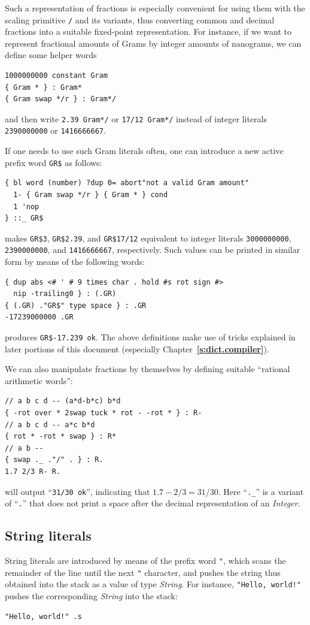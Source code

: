 \documentclass[12pt,oneside]{article}
\def\refpoint#1{{\rm\textbf{\ref{#1}}}}
\let\ptref=\refpoint
\def\mysubsection#1{\subsection{#1}\fancyhead[C]{\small{\textsc{\textrm{\thesubsection.} #1}}}}
\begin{document}
Such a representation of fractions is especially convenient for using them with the scaling primitive {\tt */} and its variants, thus converting common and decimal fractions into a suitable fixed-point representation. For instance, if we want to represent fractional amounts of Grams by integer amounts of nanograms, we can define some helper words
\begin{verbatim}
1000000000 constant Gram
{ Gram * } : Gram*
{ Gram swap */r } : Gram*/
\end{verbatim}
and then write {\tt 2.39 Gram*/} or {\tt 17/12 Gram*/} instead of integer literals {\tt 2390000000} or {\tt 1416666667}.

If one needs to use such Gram literals often, one can introduce a new active prefix word {\tt GR\$} as follows:
\begin{verbatim}
{ bl word (number) ?dup 0= abort"not a valid Gram amount"
  1- { Gram swap */r } { Gram * } cond
  1 'nop
} ::_ GR$
\end{verbatim}
makes {\tt GR\$3}, {\tt GR\$2.39}, and {\tt GR\$17/12} equivalent to integer literals {\tt 3000000000}, {\tt 2390000000}, and {\tt 1416666667}, respectively. Such values can be printed in similar form by means of the following words:
\begin{verbatim}
{ dup abs <# ' # 9 times char . hold #s rot sign #>
  nip -trailing0 } : (.GR)
{ (.GR) ."GR$" type space } : .GR
-17239000000 .GR
\end{verbatim}
produces {\tt GR\$-17.239 ok}. The above definitions make use of tricks explained in later portions of this document (especially Chapter~\ptref{s:dict.compiler}).

We can also manipulate fractions by themselves by defining suitable ``rational arithmetic words'':
\begin{verbatim}
// a b c d -- (a*d-b*c) b*d
{ -rot over * 2swap tuck * rot - -rot * } : R-
// a b c d -- a*c b*d
{ rot * -rot * swap } : R*
// a b --
{ swap ._ ."/" . } : R.
1.7 2/3 R- R.
\end{verbatim}
will output ``{\tt 31/30 ok}'', indicating that $1.7-2/3=31/30$. Here ``{\tt .\_}'' is a variant of ``{\tt .}'' that does not print a space after the decimal representation of an {\em Integer}.

\mysubsection{String literals}\label{p:string.lit}
String literals are introduced by means of the prefix word {\tt "}, which scans the remainder of the line until the next {\tt "} character, and pushes the string thus obtained into the stack as a value of type {\em String}. For instance, {\tt "Hello, world!"} pushes the corresponding {\em String\/} into the stack:
\begin{verbatim}
"Hello, world!" .s
\end{verbatim}
\end{document}

